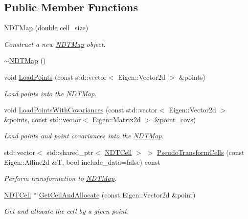 \subsection*{Public Member Functions}
\begin{DoxyCompactItemize}
\item 
\hyperlink{classNDTMap_aec578016c17abfe085d0d4cf1dca1828}{N\+D\+T\+Map} (double \hyperlink{test__match_8cc_a456553c1fc05d94c07e74c5fd45f6621}{cell\+\_\+size})
\begin{DoxyCompactList}\small\item\em Construct a new \hyperlink{classNDTMap}{N\+D\+T\+Map} object. \end{DoxyCompactList}\item 
\hyperlink{classNDTMap_af6e42f0f13a33e6027e14635631e1312}{$\sim$\+N\+D\+T\+Map} ()
\item 
void \hyperlink{classNDTMap_ab22791d0b328ae9639799bc5d31d8b49}{Load\+Points} (const std\+::vector$<$ Eigen\+::\+Vector2d $>$ \&points)
\begin{DoxyCompactList}\small\item\em Load points into the \hyperlink{classNDTMap}{N\+D\+T\+Map}. \end{DoxyCompactList}\item 
void \hyperlink{classNDTMap_a00f9fe19e50c264cb4cf1de68f0c05e3}{Load\+Points\+With\+Covariances} (const std\+::vector$<$ Eigen\+::\+Vector2d $>$ \&points, const std\+::vector$<$ Eigen\+::\+Matrix2d $>$ \&point\+\_\+covs)
\begin{DoxyCompactList}\small\item\em Load points and point covariances into the \hyperlink{classNDTMap}{N\+D\+T\+Map}. \end{DoxyCompactList}\item 
std\+::vector$<$ std\+::shared\+\_\+ptr$<$ \hyperlink{classNDTCell}{N\+D\+T\+Cell} $>$ $>$ \hyperlink{classNDTMap_a3d16c1f716de28d6c5a6572346c45ee6}{Pseudo\+Transform\+Cells} (const Eigen\+::\+Affine2d \&T, bool include\+\_\+data=false) const
\begin{DoxyCompactList}\small\item\em Perform transformation to \hyperlink{classNDTMap}{N\+D\+T\+Map}. \end{DoxyCompactList}\item 
\hyperlink{classNDTCell}{N\+D\+T\+Cell} $\ast$ \hyperlink{classNDTMap_ab37c2e140bf7b138be3cd0b4d5104dfc}{Get\+Cell\+And\+Allocate} (const Eigen\+::\+Vector2d \&point)
\begin{DoxyCompactList}\small\item\em Get and allocate the cell by a given point. \end{DoxyCompactList}\item 

\end{DoxyCompactItemize}
